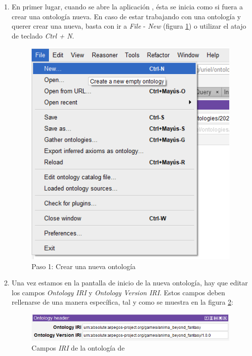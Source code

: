\begin{enumerate}
    
    \item En primer lugar, cuando se abre la aplicación \protege, ésta se inicia como si fuera a crear una ontología nueva. En 
    caso de estar trabajando con una ontología y querer crear una nueva, basta con ir a \textit{File} - \textit{New} (figura \ref*{Create_new_ontology}) o utilizar 
    el atajo de teclado \textit{Ctrl + N}.

    \begin{figure}[H]
        \centering
        \includegraphics[scale=0.6]{Figures/Protege/Create_Ontology.png}
        \caption{Paso 1: Crear una nueva ontología}
        \label{Create_new_ontology}
    \end{figure}

    \item Una vez estamos en la pantalla de inicio de la nueva ontología, hay que editar los campos \textit{Ontology IRI} y 
    \textit{Ontology Version IRI}. Estos campos deben rellenarse de una manera específica, tal y como se muestra en la 
    figura \ref*{IRI_demo}:

    \begin{figure}[ht]
        \centering
        \includegraphics[scale=0.6]{Figures/Protege/IRI_demo.png}
        \caption{Campos \textit{IRI} de la ontología de \anima}
        \label{IRI_demo}
    \end{figure}


\end{enumerate}
